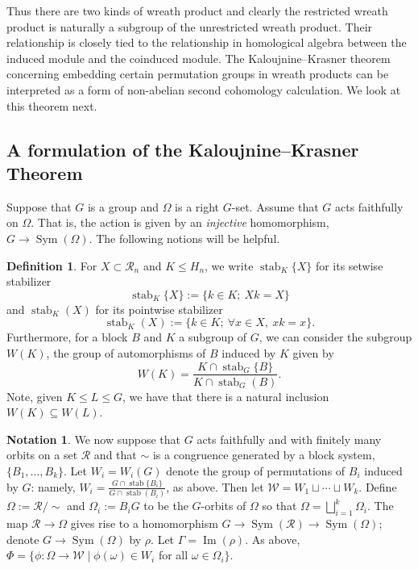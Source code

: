 \documentclass[11pt,a4paper]{amsart}
\theoremstyle{definition}
\newtheorem{definition}[theorem]{Definition}
\newtheorem{notation}[theorem]{Notation}
\theoremstyle{remark}
\newcommand{\Sym}{\operatorname{Sym}}
\newcommand{\Ra}{\mathcal{R}}
\newcommand{\im}{\operatorname{Im}}
\newcommand{\stab}{\operatorname{stab}}
\begin{document}
Thus there are two kinds of wreath product and clearly the restricted wreath product is naturally a subgroup of the unrestricted wreath product. Their relationship is closely tied to the relationship in homological algebra between the induced module and the coinduced module. The Kaloujnine--Krasner theorem concerning embedding certain permutation groups in wreath products can be interpreted as a form of non-abelian second cohomology calculation. We look at this theorem next.


\subsection*{A formulation of the Kaloujnine--Krasner Theorem}
Suppose that $G$ is a group and $\Omega$ is a right $G$-set. Assume that $G$ acts faithfully on $\Omega$. That is, the action is given by an \textit{injective} homomorphism, $G \to \Sym(\Omega)$. The following notions will be helpful.

\begin{definition}
For $X\subset \Ra_n$ and $K\le H_n$, we write $\stab_K\{X\}$ for its setwise stabilizer
$$\stab_K\{X\}:=\{k\in K;\ Xk=X\}$$
and $\stab_K(X)$ for its pointwise stabilizer
$$\stab_K(X):=\{k\in K;\ \forall x\in X,\ xk=x\}.$$
Furthermore, for a block $B$ and $K$ a subgroup of $G$, we can consider the subgroup $W(K)$, the group of automorphisms of $B$ induced by $K$ given by
$$W(K)=\frac{K\cap\stab_G\{B\}}{K\cap\stab_G(B)}.$$
Note, given $K\le L\le G$, we have that there is a natural inclusion $W(K)\subseteq W(L)$.
\end{definition}


\begin{notation} We now suppose that $G$ acts faithfully and with finitely many orbits on a set $\Ra$ and that $\sim$ is a congruence generated by a block system, $\{B_1, \ldots , B_k\}$. Let $W_i=W_i(G)$ denote the group of permutations of $B_i$ induced by $G$: namely, $W_i=\frac{G\cap\stab\{B_i\}}{G\cap\stab(B_i)}$, as above. Then let $\mathcal{W} = W_1 \sqcup \cdots \sqcup W_k$. Define $\Omega := \Ra/\sim$ and {$\Omega_i:=B_iG$ to be the $G$-orbits of $\Omega$ so that $\Omega=\bigsqcup_{i=1}^k\Omega_i$}. The map $\Ra \to \Omega$ gives rise to a homomorphism $G \to \Sym(\Ra) \to \Sym(\Omega)$; denote $G \to \Sym(\Omega)$ by $\rho$. Let $\Gamma=\im(\rho)$. As above, $\Phi=\{\phi: \Omega \to \mathcal{W} \mid \phi(\omega)\in W_i$ for all $\omega\in \Omega_i\}$.
\end{notation}
\end{document}
